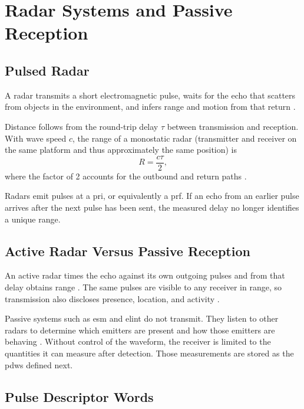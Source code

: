 \section{Radar Systems and Passive Reception}\label{sec:bg:radar}

\subsection*{Pulsed Radar}

A radar transmits a short electromagnetic pulse, waits for the echo that scatters from objects in the environment, and infers range and motion from that return \parencite{skolnik2008radar}.

Distance follows from the round-trip delay $\tau$ between transmission and reception.
With wave speed $c$, the range of a monostatic radar (transmitter and receiver on the same platform and thus approximately the same position) is
\begin{equation}
\label{eq:bg:range}
R = \frac{c\tau}{2},
\end{equation}
where the factor of 2 accounts for the outbound and return paths \parencite{skolnik2008radar}.

Radars emit pulses at a \gls{pri}, or equivalently a \gls{prf}.
If an echo from an earlier pulse arrives after the next pulse has been sent, the measured delay no longer identifies a unique range.

\subsection*{Active Radar Versus Passive Reception}

An active radar times the echo against its own outgoing pulses and from that delay obtains range \parencite{skolnik2008radar}.
The same pulses are visible to any receiver in range, so transmission also discloses presence, location, and activity \parencite{wiley2006elint}.

Passive systems such as \gls{esm} and \gls{elint} do not transmit.
They listen to other radars to determine which emitters are present and how those emitters are behaving \parencite{wiley2006elint}.
Without control of the waveform, the receiver is limited to the quantities it can measure after detection.
Those measurements are stored as the \glspl{pdw} defined next.

\subsection{Pulse Descriptor Words}\label{sec:bg:pdw}

